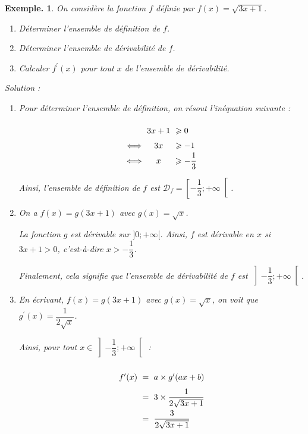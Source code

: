 \documentclass[12pt]{article}
\theoremstyle{break}
\newtheorem*{example}{Exemple.}
\begin{document}
\begin{example}
On considère la fonction $f$ définie par $f(x)=\sqrt{3 x+1}$.
\begin{enumerate}
  \item Déterminer l'ensemble de définition de $f$.
  \item Déterminer l'ensemble de dérivabilité de $f$.
  \item Calculer $f^{\prime}(x)$ pour tout $x$ de l'ensemble de dérivabilité.
\end{enumerate}

Solution :
\begin{enumerate}
  \item Pour déterminer l'ensemble de définition, on résout l'inéquation suivante :

\begin{equation*}\arraycolsep=3pt\def\arraystretch{1.5}
  \begin{array}{rcl}
  & 3 x+1 &\geqslant 0 \\
  \Longleftrightarrow& 3 x &\geqslant-1 \\
  \Longleftrightarrow& x &\geqslant-\dfrac{1}{3}
  \end{array}
\end{equation*}

Ainsi, l'ensemble de définition de $f$ est $\mathcal{D}_{f}=\left[-\dfrac{1}{3} ;+\infty\right[$.

\item On a $f(x)=g(3 x+1)$ avec $g(x)=\sqrt{x}$.

La fonction $g$ est dérivable sur $] 0 ;+\infty[$. Ainsi, $f$ est dérivable en $x$ si $3 x+1>0$, c'est-à-dire $x>-\dfrac{1}{3}$.

Finalement, cela signifie que l'ensemble de dérivabilité de $f$ est $\left]-\dfrac{1}{3} ;+\infty\right[$.

\item En écrivant, $f(x)=g(3 x+1)$ avec $g(x)=\sqrt{x}$, on voit que $g^{\prime}(x)=\dfrac{1}{2 \sqrt{x}}$.

Ainsi, pour tout $x \in\left]-\dfrac{1}{3} ;+\infty\right[$ :

\begin{equation*}\arraycolsep=3pt\def\arraystretch{2}
  \begin{array}{rcl}
  f^{\prime}(x) & = & a \times g^{\prime}(a x+b) \\
  & = & 3 \times \dfrac{1}{2 \sqrt{3 x+1}} \\
  & = & \dfrac{3}{2 \sqrt{3 x+1}}
  \end{array}
\end{equation*}
\end{enumerate}
\end{example}
\end{document}
